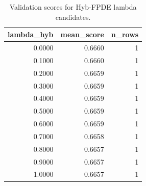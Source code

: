 \begin{table}[t]
\caption{Validation scores for Hyb-FPDE lambda candidates.}
\label{tab:lambda_distribution_computed}
\centering
\begin{tabular}{rrr}
\toprule
lambda\_hyb & mean\_score & n\_rows \\
\midrule
0.0000 & 0.6660 & 1 \\
0.1000 & 0.6660 & 1 \\
0.2000 & 0.6659 & 1 \\
0.3000 & 0.6659 & 1 \\
0.4000 & 0.6659 & 1 \\
0.5000 & 0.6659 & 1 \\
0.6000 & 0.6659 & 1 \\
0.7000 & 0.6658 & 1 \\
0.8000 & 0.6657 & 1 \\
0.9000 & 0.6657 & 1 \\
1.0000 & 0.6657 & 1 \\
\bottomrule
\end{tabular}

\end{table}
